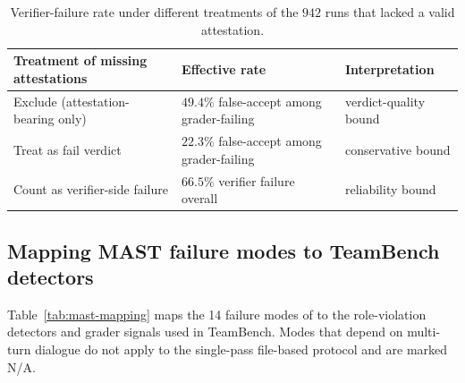 \documentclass{article}
\begin{document}
\begin{table}[h]
\centering
\caption{Verifier-failure rate under different treatments of the $942$ runs that lacked a valid attestation.}
\label{tab:evaluator-missingness}
\small
\setlength{\tabcolsep}{6pt}
\begin{tabular}{lll}
\toprule
Treatment of missing attestations & Effective rate & Interpretation \\
\midrule
Exclude (attestation-bearing only) & $49.4\%$ false-accept among grader-failing & verdict-quality bound \\
Treat as fail verdict              & $22.3\%$ false-accept among grader-failing & conservative bound \\
Count as verifier-side failure     & $66.5\%$ verifier failure overall          & reliability bound \\
\bottomrule
\end{tabular}
\end{table}

\subsection{Mapping MAST failure modes to TeamBench detectors}
\label{app:mast-mapping}

Table~\ref{tab:mast-mapping} maps the 14 failure modes of \citet{cemri2025whyfail} to the role-violation detectors and grader signals used in TeamBench. Modes that depend on multi-turn dialogue do not apply to the single-pass file-based protocol and are marked N/A.
\end{document}
